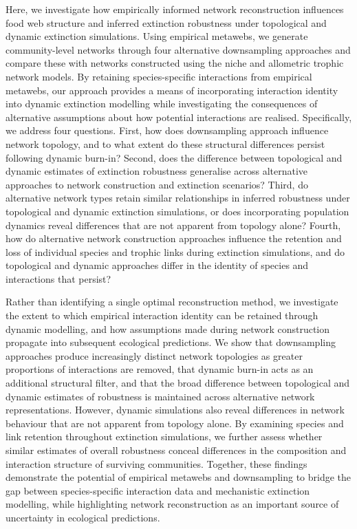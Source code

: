 \documentclass[
]{article}
\begin{document}
Here, we investigate how empirically informed network reconstruction
influences food web structure and inferred extinction robustness under
topological and dynamic extinction simulations. Using empirical
metawebs, we generate community-level networks through four alternative
downsampling approaches and compare these with networks constructed
using the niche and allometric trophic network models. By retaining
species-specific interactions from empirical metawebs, our approach
provides a means of incorporating interaction identity into dynamic
extinction modelling while investigating the consequences of alternative
assumptions about how potential interactions are realised. Specifically,
we address four questions. First, how does downsampling approach
influence network topology, and to what extent do these structural
differences persist following dynamic burn-in? Second, does the
difference between topological and dynamic estimates of extinction
robustness generalise across alternative approaches to network
construction and extinction scenarios? Third, do alternative network
types retain similar relationships in inferred robustness under
topological and dynamic extinction simulations, or does incorporating
population dynamics reveal differences that are not apparent from
topology alone? Fourth, how do alternative network construction
approaches influence the retention and loss of individual species and
trophic links during extinction simulations, and do topological and
dynamic approaches differ in the identity of species and interactions
that persist?

Rather than identifying a single optimal reconstruction method, we
investigate the extent to which empirical interaction identity can be
retained through dynamic modelling, and how assumptions made during
network construction propagate into subsequent ecological predictions.
We show that downsampling approaches produce increasingly distinct
network topologies as greater proportions of interactions are removed,
that dynamic burn-in acts as an additional structural filter, and that
the broad difference between topological and dynamic estimates of
robustness is maintained across alternative network representations.
However, dynamic simulations also reveal differences in network
behaviour that are not apparent from topology alone. By examining
species and link retention throughout extinction simulations, we further
assess whether similar estimates of overall robustness conceal
differences in the composition and interaction structure of surviving
communities. Together, these findings demonstrate the potential of
empirical metawebs and downsampling to bridge the gap between
species-specific interaction data and mechanistic extinction modelling,
while highlighting network reconstruction as an important source of
uncertainty in ecological predictions.
\end{document}

